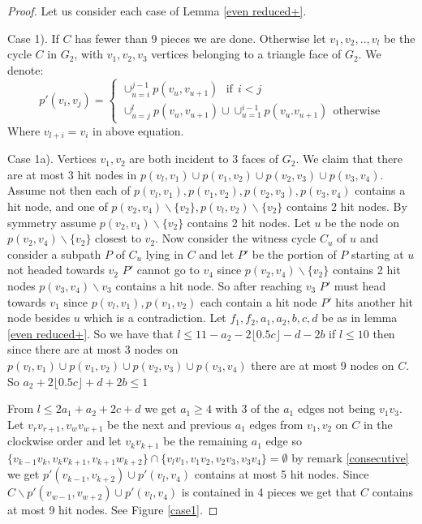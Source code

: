 \documentclass{article}
\newcommand{\0}{\mathbb{0}}
\newcommand{\1}{\mathbb{1}}
\begin{document}
\begin{proof} 
Let us consider each case of Lemma \ref{even reduced+}. 

Case 1). If $C$ has fewer than 9 pieces we are done. Otherwise let $v_1, v_2, .., v_l$ be the cycle $C$ in $G_2$, with $v_1, v_2, v_3$ vertices belonging to a triangle face of $G_2$. We denote: \begin{equation}
    p'(v_i,v_j) = \begin{cases} 
    \cup_{u=i}^{j-1} p(v_u,v_{u+1}  ) \ \ \ \text{if} \ \  i <j \\
    \cup_{u=j}^{l} p(v_u,v_{u+1} ) \cup \cup_{u=1}^{i-1} p(v_u.v_{u+1}  ) \ \ \text{otherwise}
    \end{cases}
\end{equation} 
Where $ v_{l+i} = v_i $ in above equation. 

Case 1a). Vertices $v_1, v_2$ are both incident to 3 faces of $G_2$. We claim that there are at most 3 hit nodes in $p(v_l,v_1) \cup p(v_1, v_2) \cup p(v_2,v_3) \cup p(v_3,v_4)$.
Assume not then each of $p(v_l,v_1) , p(v_1, v_2) , p(v_2,v_3) , p(v_3,v_4)$ contains a hit node, and one of $p(v_2,v_4) \backslash \{v_2 \} , p(v_l,v_2) \backslash \{v_2 \}$  contains 2 hit nodes. By symmetry assume $p(v_2,v_4) \backslash \{v_2 \}$ contains 2 hit nodes. Let $u$ be the node on $p(v_2,v_4) \backslash \{ v_2 \} $  closest to $ v_2$. Now consider the witness cycle $C_u$ of $u$ and consider a subpath $P$ of $ C_u$ lying in $  C $ and let $P'$ be the portion of $P$ starting at $u$ not headed towards $v_2$ $P'$ cannot go to $v_4$ since $p(v_2,v_4) \backslash \{v_2 \}$  contains 2 hit nodes $ p(v_3,v_4) \backslash v_3 $ contains a hit node. So after reaching $v_3$ $P'$ must head towards $ v_1 $ since $p(v_l,v_1) , p(v_1, v_2)$ each contain a hit node $P'$ hits another hit node besides $u$ which is a contradiction.
Let $ f_1,f_2 , a_1, a_2, b,c , d $ be as in lemma \ref{even reduced+}. So we have that $ l \leq 11- a_2 -  2 \lfloor 0.5 c \rfloor -d -2b $  if $l \leq 10 $ then %
since there are at most 3 nodes on $p(v_l,v_1) \cup p(v_1, v_2) \cup p(v_2,v_3) \cup p(v_3,v_4)$  there are at most 9 nodes on $C$. So $a_2 +  2 \lfloor 0.5 c \rfloor +d +2b \leq 1 $

From $l \leq 2a_1+a_2+2c+d$  we get $a_1 \geq 4$ with 3 of the $a_1$ edges not being $v_1v_3$.  Let $ v_r v_{r+1}, v_w v_{w+1} $ be the next and previous $a_1$ edges from $ v_1, v_2 $ on $C$ in the clockwise order and let $ v_k v_{k+1}$ be the remaining $a_1$ edge so $ \{ v_{k-1}v_{k}, v_{k} v_{k+1}, v_{k+1} w_{k+2} \} \cap\{ v_lv_1, v_1v_2,v_2v_3, v_3v_4 \} = \emptyset$ by remark \ref{consecutive} we get 
$ p'( v_{k-1}, v_{k+2} ) \cup p'( v_l , v_ 4 ) $ contains at most 5 hit nodes.
 Since $C \backslash p'( v_{w-1}, v_{w+2} ) \cup p'( v_l , v_ 4 ) $ is contained in 4 pieces we get that $C$ contains at most 9 hit nodes. See Figure \ref{case1}.
 

\end{proof}
\end{document}
